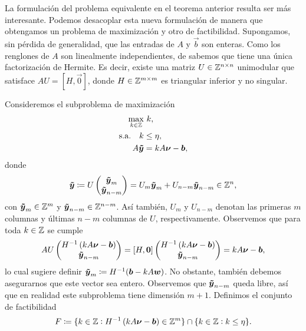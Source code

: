 La formulación del problema equivalente en el teorema anterior resulta ser más interesante. Podemos
desacoplar esta nueva formulación de manera que obtengamos un problema de maximización y otro de
factibilidad. Supongamos, sin pérdida de generalidad, que las entradas de $A$ y $\vec{b}$ son
enteras. Como los renglones de $A$ son linealmente independientes, de \cite{alex} sabemos que tiene
una única factorización de Hermite. Es decir, existe una matriz $U \in \mathbb{Z}^{n \times n}$ unimodular
que satisface $AU = [H, \vec{0}]$, donde $H \in \mathbb{Z}^{m \times m}$ es triangular inferior y no
singular.

Consideremos el subproblema de maximización
\begin{subequations}
	\label{subformulation:lattice}
	\begin{align}
		\max_{k \in \mathbb{Z}}
			& ~ k, \\
		\text{s.a.} \quad
		k &\leq \eta, \\
			A\boldsymbol{\tilde{y}} &= kA\boldsymbol{\nu} - \boldsymbol{b},
	\end{align}
\end{subequations}
donde 
\begin{equation*}
	\boldsymbol{\tilde{y}} \coloneq U \begin{pmatrix} \boldsymbol{\tilde{y}}_m \\ \boldsymbol{\tilde{y}}_{n-m} \end{pmatrix}
	= U_m\boldsymbol{\tilde{y}}_m + U_{n-m}\boldsymbol{\tilde{y}}_{n-m} \in \mathbb{Z}^n,
\end{equation*}
con $\boldsymbol{\tilde{y}}_m \in \mathbb{Z}^m$ y $\boldsymbol{\tilde{y}}_{n-m} \in \mathbb{Z}^{n-m}$. Así también, $U_m$ y
$U_{n-m}$ denotan las primeras $m$ columnas y últimas $n - m$ columnas de $U$, respectivamente.
Observemos que para toda $k \in \mathbb{Z}$ se cumple
\begin{equation}
	AU \begin{pmatrix} H^{-1}\left(kA\boldsymbol{\nu} - \boldsymbol{b}\right) \\ \boldsymbol{\tilde{y}}_{n-m} \end{pmatrix}
	=
	[H, \boldsymbol{0}] \begin{pmatrix} H^{-1}\left(kA\boldsymbol{\nu} - \boldsymbol{b}\right) \\ \boldsymbol{\tilde{y}}_{n-m} \end{pmatrix}
	= kA\boldsymbol{\nu} - \boldsymbol{b},
\end{equation}
lo cual sugiere definir $\boldsymbol{\tilde{y}}_m \coloneq H^{-1}(\boldsymbol{b} - kA\boldsymbol{w})$. No obstante,
también debemos asegurarnos que este vector sea entero. Observemos que $\boldsymbol{\tilde{y}}_{n-m}$ queda
libre, así que en realidad este subproblema tiene dimensión $m + 1$. Definimos el conjunto de
factibilidad
\begin{equation}
	\label{eq:feas-set}
	F \coloneq \lbrace k \in \mathbb{Z} \vcentcolon H^{-1}\left(kA\boldsymbol{\nu} - \boldsymbol{b}\right) \in \mathbb{Z}^m \rbrace
	\cap \lbrace k \in \mathbb{Z} \vcentcolon k \leq \eta \rbrace.
\end{equation}
